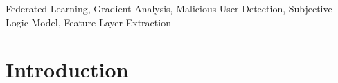 \documentclass[conference]{IEEEtran}
\begin{document}
\begin{IEEEkeywords}

Federated Learning, Gradient Analysis, Malicious User Detection, Subjective Logic Model, Feature Layer Extraction
\end{IEEEkeywords}

\section{Introduction}

\label{sec:intro}




\end{document}
